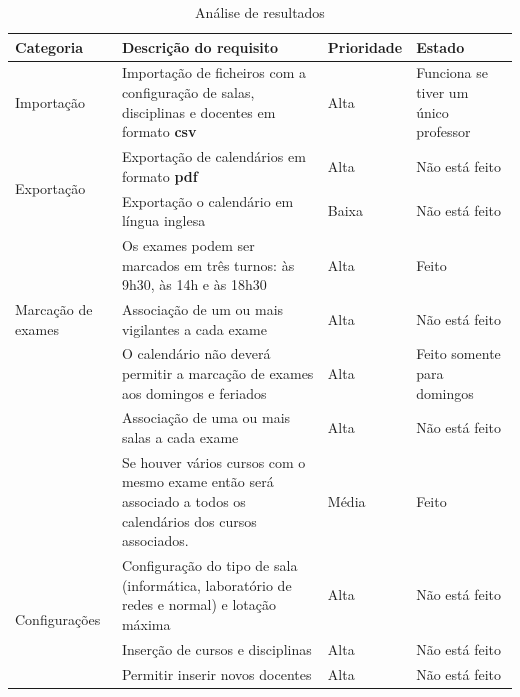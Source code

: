 \documentclass[11pt, twoside]{report}
\begin{document}
	\def\arraystretch{1.5}
	\begin{center}
		\label{analiseresultados}
		\begin{longtable}{|m{2.2cm}|m{10cm}|m{2cm}|m{2cm}|}
			\caption{Análise de resultados}\\
			
			\hline			
			\textbf{Categoria}&\textbf{Descrição do requisito} & \textbf{Prioridade} &\textbf{Estado}\\
			\hline
			
			Importação& Importação de ficheiros com a configuração de salas, disciplinas e docentes em formato \textbf{csv} & Alta & Funciona se tiver um único professor\\
			\hline
			
			\multirow{2}{2cm}{Exportação}& Exportação de calendários em formato \textbf{pdf} & Alta & Não está feito\\
			
			& Exportação o calendário em língua inglesa & Baixa & Não está feito\\
			\hline
			
			\multirow{3}{2cm}{Marcação de exames}& Os exames podem ser marcados em três turnos: às 9h30, às 14h e às 18h30 & Alta & Feito\\
			
			& Associação de um ou mais vigilantes a cada exame & Alta & Não está feito\\
			
			& O calendário não deverá permitir a marcação de exames aos domingos e feriados & Alta & Feito somente para domingos\\
			
			&	Associação de uma ou mais salas a cada exame & Alta & Não está feito\\
			
			& Se houver vários cursos com o mesmo exame então será associado a todos os calendários dos cursos associados. & Média & Feito\\
			\hline
			
			 \multirow{7}{2cm}{Configurações}& Configuração do tipo de sala (informática, laboratório de redes e normal) e lotação máxima & Alta & Não está feito\\
			
			 & Inserção de cursos e disciplinas & Alta & Não está feito\\
			
			& Permitir inserir novos docentes & Alta & Não está feito\\
			

\end{longtable}
\end{center}
\end{document}
